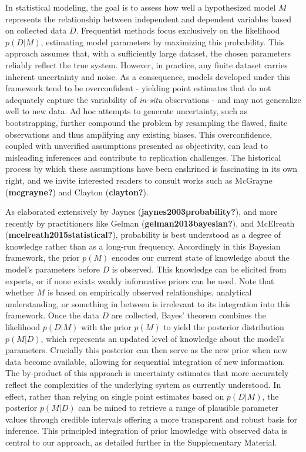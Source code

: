 \documentclass[
]{agujournal2019}
\begin{document}
In statistical modeling, the goal is to assess how well a hypothesized
model \(M\) represents the relationship between independent and
dependent variables based on collected data \(D\). Frequentist methods
focus exclusively on the likelihood \(p(D|M)\), estimating model
parameters by maximizing this probability. This approach assumes that,
with a sufficiently large dataset, the chosen parameters reliably
reflect the true system. However, in practice, any finite dataset
carries inherent uncertainty and noise. As a consequence, models
developed under this framework tend to be overconfident - yielding point
estimates that do not adequately capture the variability of
\emph{in-situ} observations - and may not generalize well to new data.
Ad hoc attempts to generate uncertainty, such as bootstrapping, further
compound the problem by resampling the flawed, finite observations and
thus amplifying any existing biases. This overconfidence, coupled with
unverified assumptions presented as objectivity, can lead to misleading
inferences and contribute to replication challenges. The historical
process by which these assumptions have been enshrined is fascinating in
its own right, and we invite interested readers to consult works such as
McGrayne (\textbf{mcgrayne?}) and Clayton (\textbf{clayton?}).

As elaborated extensively by Jaynes (\textbf{jaynes2003probability?}),
and more recently by practitioners like Gelman
(\textbf{gelman2013bayesian?}), and McElreath
(\textbf{mcelreath2015statistical?}), probability is best understood as
a degree of knowledge rather than as a long-run frequency. Accordingly
in this Bayesian framework, the prior \(p(M)\) encodes our current state
of knowledge about the model's parameters before \(D\) is observed. This
knowledge can be elicited from experts, or if none exixts weakly
informative priors can be used. Note that whether \(M\) is based on
empirically observed relationships, analytical understanding, or
something in between is irrelevant to its integration into this
framework. Once the data \(D\) are collected, Bayes' theorem combines
the likelihood \(p(D|M)\) with the prior \(p(M)\) to yield the posterior
distribution \(p(M|D)\), which represents an updated level of knowledge
about the model's parameters. Crucially this posterior can then serve as
the new prior when new data become available, allowing for sequential
integration of new information. The by-product of this approach is
uncertainty estimates that more accurately reflect the complexities of
the underlying system as currently understood. In effect, rather than
relying on single point estimates based on \(p(D|M)\), the posterior
\(p(M|D)\) can be mined to retrieve a range of plausible parameter
values through credible intervals offering a more transparent and robust
basis for inference. This principled integration of prior knowledge with
observed data is central to our approach, as detailed further in the
Supplementary Material.
\end{document}
